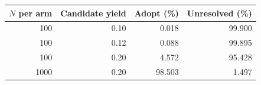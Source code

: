 \begin{tabular}{rrrr}
\toprule
$N$ per arm & Candidate yield & Adopt (\%) & Unresolved (\%)\\
\midrule
100 & 0.10 & 0.018 & 99.900\\
100 & 0.12 & 0.088 & 99.895\\
100 & 0.20 & 4.572 & 95.428\\
1000 & 0.20 & 98.503 & 1.497\\
\bottomrule
\end{tabular}
